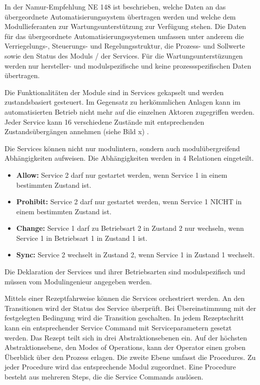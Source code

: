 In der Namur-Empfehlung NE 148 \cite{NAMURArbeitskreis1.122013} ist beschrieben, welche Daten an das übergeordnete Automatisierungssystem übertragen werden und welche dem Modullieferanten zur Wartungsunterstützung zur Verfügung stehen. Die Daten für das übergeordnete Automatisierungssystemen umfassen unter anderem die Verriegelungs-, Steuerungs- und Regelungsstruktur, die Prozess- und Sollwerte sowie den Status des Moduls / der Services. Für die Wartungsunterstüzungen werden nur hersteller- und modulspezifische und keine prozessspezifischen Daten übertragen.

Die Funktionalitäten der Module sind in Services gekapselt und werden zustandsbasiert gesteuert. Im Gegensatz zu herkömmlichen Anlagen kann im automatisierten Betrieb nicht mehr auf die einzelnen Aktoren zugegriffen werden. Jeder Service kann 16 verschiedene Zustände mit entsprechenden Zustandsübergängen annehmen (siehe Bild x) .

Die Services können nicht nur modulintern, sondern auch modulübergreifend Abhängigkeiten aufweisen. Die Abhängigkeiten werden in 4 Relationen eingeteilt.
\begin{itemize}
\item \textbf{Allow:} Service 2 darf nur gestartet werden, wenn Service 1 in einem bestimmten Zustand ist.
\item \textbf{Prohibit:} Service 2 darf nur gestartet werden, wenn Service 1 NICHT in einem bestimmten Zustand ist.
\item \textbf{Change:} Service 1 darf zu Betriebsart 2 in Zustand 2 nur wechseln, wenn Service 1 in Betriebsart 1 in Zustand 1 ist.
\item \textbf{Sync:} Service 2 wechselt in Zustand 2, wenn Service 1 in Zustand 1 wechselt.
\end{itemize} 
Die Deklaration der Services und ihrer Betriebsarten sind modulspezifisch und müssen vom Modulingenieur angegeben werden. \cite{Ladiges2018}

Mittels einer Rezeptfahrweise können die Services orchestriert werden. An den Transitionen wird der Status des Service überprüft. Bei Übereinstimmung mit der festgelegten Bedingung wird die Transition geschalten. In jedem Rezeptschritt kann ein entsprechender Service Command mit Serviceparametern gesetzt werden. Das Rezept teilt sich in drei Abstraktionsebenen ein. Auf der höchsten Abstraktionsebene, den Modes of Operations, kann der Operator einen groben Überblick über den Prozess erlagen. Die zweite Ebene umfasst die Procedures. Zu jeder Procedure wird das entsprechende Modul zugeordnet. Eine Procedure besteht aus mehreren Steps, die die Service Commands auslösen. 

